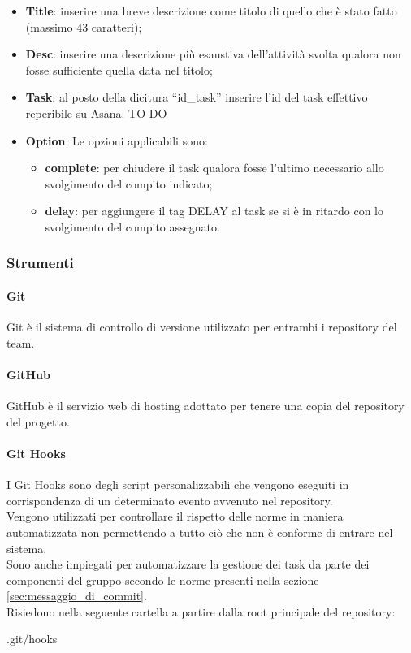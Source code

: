 					\begin{itemize}
						\item \textbf{Title}: inserire una breve descrizione come titolo di quello che è stato fatto (massimo 43 caratteri);
						\item \textbf{Desc}: inserire una descrizione più esaustiva dell'attività svolta qualora non fosse sufficiente quella data nel titolo;
						\item \textbf{Task}: al posto della dicitura ``id\_task'' inserire l'id del task effettivo reperibile su Asana. TO DO
						\item \textbf{Option}: Le opzioni applicabili sono:
							\begin{itemize}
								\item \textbf{complete}: per chiudere il task qualora fosse l'ultimo necessario allo svolgimento del compito indicato;
								\item \textbf{delay}: per aggiungere il tag DELAY al task se si è in ritardo con lo svolgimento del compito assegnato.
							\end{itemize}
					\end{itemize}
									
		\subsubsection{Strumenti}
			\paragraph{Git}
			Git è il sistema di controllo di versione utilizzato per entrambi i repository del team.	
			\paragraph{GitHub}
			GitHub è il servizio web di hosting adottato per tenere una copia del repository del progetto.
			\paragraph{Git Hooks}
			I Git Hooks sono degli script personalizzabili che vengono eseguiti in corrispondenza di un determinato evento avvenuto nel repository. \\
			Vengono utilizzati per controllare il rispetto delle norme in maniera automatizzata non permettendo a tutto ciò che non è conforme di entrare nel sistema. \\
			Sono anche impiegati per automatizzare la gestione dei task da parte dei componenti del gruppo secondo le norme presenti nella sezione \ref{sec:messaggio_di_commit}. \\
			Risiedono nella seguente cartella a partire dalla root principale del repository:
				\begin{center}
					.git/hooks
				\end{center}
